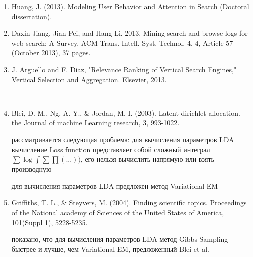 \documentclass[12pt,a4paper]{article}
\begin{document}
\begin{enumerate}
\item Huang, J. (2013). Modeling User Behavior and Attention in Search (Doctoral dissertation).

\item Daxin Jiang, Jian Pei, and Hang Li. 2013. Mining search and browse logs for web search: A Survey. ACM Trans. Intell. Syst. Technol. 4, 4, Article 57 (October 2013), 37 pages.

\item J. Arguello and F. Diaz, "Relevance Ranking of Vertical Search Engines," Vertical Selection and Aggregation. Elsevier, 2013.

---
\item Blei, D. M., Ng, A. Y., \& Jordan, M. I. (2003). Latent dirichlet allocation. the Journal of machine Learning research, 3, 993-1022.

  рассматривается следующая проблема: для вычисления параметров LDA вычисление
  Loss function представляет собой сложный интеграл $\sum \log \int \sum \prod (...))$, его нельзя вычислить напрямую или взять производную

  для вычисления параметров LDA предложен метод Variational EM

\item Griffiths, T. L., \& Steyvers, M. (2004). Finding scientific topics. Proceedings of the National academy of Sciences of the United States of America, 101(Suppl 1), 5228-5235.

  показано, что для вычисления параметров LDA метод Gibbs Sampling быстрее и
  лучше, чем Variational EM, предложенный Blei et al.

\end{enumerate}
\end{document}
